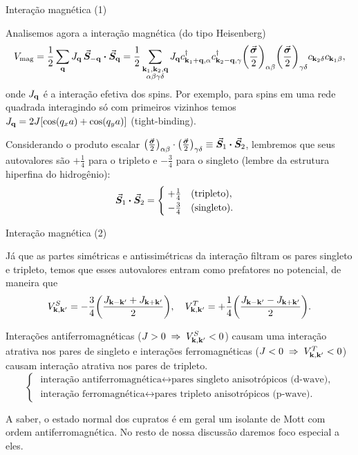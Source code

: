 \documentclass[8pt,aspectratio=169,xcolor={table,dvipsnames,usenames}]{beamer}
\begin{document}
\begin{frame}{Interação magnética (1)}

Analisemos agora a interação magnética (do tipo Heisenberg)
$$
V_{\text{mag}} = \frac{1}{2} \sum_{\q} J_{\q} \, \va*{S}_{-\q} \vdot \va*{S}_{\q} =
\frac{1}{2} \sum_{\substack{\k_1,\k_2,\q \\ \alpha\beta\gamma\delta}} J_{\q} c_{\k_1+\q,\alpha}^\d c_{\k_2-\q,\gamma}^\d
\qty(\frac{\va*{\s}}{2})_{\alpha\beta} \qty(\frac{\va*{\s}}{2})_{\gamma\delta} c_{\k_2\delta} c_{\k_1\beta},
$$
onde $J_{\vb{q}}$ é a interação efetiva dos spins. Por exemplo, para spins em uma rede quadrada interagindo só com primeiros vizinhos temos $J_{\vb{q}} = 2 J [\cos(q_x a) + \cos(q_y a)]$ (tight-binding).

\n

Considerando o produto escalar $\qty(\frac{\va*{\s}}{2})_{\alpha\beta} \cdot \qty(\frac{\va*{\s}}{2})_{\gamma\delta} \equiv \va*{S}_1 \vdot \va*{S}_2$, lembremos que seus autovalores são $+\frac{1}{4}$ para o tripleto e $-\frac{3}{4}$ para o singleto (lembre da estrutura hiperfina do hidrogênio):
$$
\va*{S}_1 \vdot \va*{S}_2 =
\begin{cases}
\; +\frac{1}{4} \quad \text{(tripleto)}, \\
\; -\frac{3}{4} \quad \text{(singleto)}.
\end{cases}
$$

\end{frame}




\begin{frame}{Interação magnética (2)}

Já que as partes simétricas e antissimétricas da interação filtram os pares singleto e tripleto, temos que esses autovalores entram como prefatores no potencial, de maneira que
$$
V_{\vb{k},\vb{k}'}^S = -\frac{3}{4} \qty(\frac{J_{\vb{k}-\vb{k}'} + J_{\vb{k}+\vb{k}'}}{2}), \quad
V_{\vb{k},\vb{k}'}^T = +\frac{1}{4} \qty(\frac{J_{\vb{k}-\vb{k}'} - J_{\vb{k}+\vb{k}'}}{2}).
$$

Interações antiferromagnéticas ($J > 0 \; \Rightarrow \; V_{\vb{k},\vb{k}'}^S < 0$) causam uma interação atrativa nos pares de singleto e interações ferromagnéticas ($J < 0 \; \Rightarrow \; V_{\vb{k},\vb{k}'}^T < 0$) causam interação atrativa nos pares de tripleto.
$$
\begin{cases}
\; \text{interação antiferromagnética} \leftrightarrow \text{pares singleto anisotrópicos (d-wave),} \\
\; \text{interação ferromagnética} \leftrightarrow \text{pares tripleto anisotrópicos (p-wave).}
\end{cases}
$$

A saber, o estado normal dos cupratos é em geral um isolante de Mott com ordem antiferromagnética. No resto de nossa discussão daremos foco especial a eles.

\end{frame}
\end{document}
